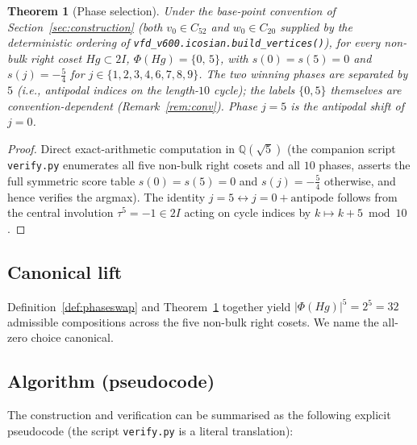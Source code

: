 \documentclass[11pt]{article}
\newtheorem{theorem}{Theorem}[section]
\newcommand{\twoI}{2I}
\begin{document}
\begin{theorem}[Phase selection]\label{thm:phases}
Under the base-point convention of Section~\ref{sec:construction}
(both $v_0 \in C_{52}$ and $w_0 \in C_{20}$ supplied by the
deterministic ordering of
\texttt{vfd\_v600.icosian.build\_vertices()}), for every non-bulk
right coset $Hg \subset \twoI$, $\Phi(Hg) = \{0,\, 5\}$, with
$s(0) = s(5) = 0$ and $s(j) = -\frac{5}{4}$ for
$j \in \{1,2,3,4,6,7,8,9\}$. The two winning phases are separated by
$5$ (i.e., antipodal indices on the length-$10$ cycle); the labels
$\{0, 5\}$ themselves are convention-dependent
(Remark~\ref{rem:conv}). Phase $j=5$ is the antipodal shift of $j=0$.
\end{theorem}

\begin{proof}
Direct exact-arithmetic computation in $\mathbb{Q}(\sqrt{5})$ (the
companion script \texttt{verify.py} enumerates all five non-bulk right
cosets and all $10$ phases, asserts the full symmetric score table
$s(0) = s(5) = 0$ and $s(j) = -\tfrac{5}{4}$ otherwise, and hence
verifies the argmax). The identity
$j=5 \leftrightarrow j=0 + \mathrm{antipode}$ follows from the central
involution $\tau^5 = -1 \in \twoI$ acting on cycle indices by
$k \mapsto k+5 \bmod 10$.
\end{proof}

\subsection{Canonical lift}

Definition~\ref{def:phaseswap} and Theorem~\ref{thm:phases} together
yield $|\Phi(Hg)|^5 = 2^5 = 32$ admissible compositions across the five
non-bulk right cosets. We name the all-zero choice canonical.

\subsection{Algorithm (pseudocode)}

The construction and verification can be summarised as the following
explicit pseudocode (the script \texttt{verify.py} is a literal
translation):
\end{document}
